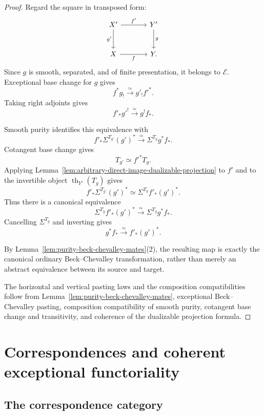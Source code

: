 \begin{proof}
Regard the square in transposed form:
\[
\begin{tikzcd}[column sep=large,row sep=large]
    X' \arrow[r,"f'"] \arrow[d,"g'"']
        & Y' \arrow[d,"g"] \\
    X \arrow[r,"f"']
        & Y.
\end{tikzcd}
\]
Since \(g\) is smooth, separated, and of finite presentation, it belongs
to \(\mathcal E\).  Exceptional base change for \(g\) gives
\[
    f^*g_!
    \xrightarrow{\simeq}
    g'_!f'^*.
\]
Taking right adjoints gives
\[
    f'_*g'^!
    \xrightarrow{\simeq}
    g^!f_*.
\]

Smooth purity identifies this equivalence with
\[
    f'_*
    \Sigma^{T_{g'}}(g')^*
    \xrightarrow{\simeq}
    \Sigma^{T_g}g^*f_*.
\]
Cotangent base change gives
\[
    T_{g'}
    \simeq
    f'^*T_g.
\]
Applying
Lemma~\ref{lem:arbitrary-direct-image-dualizable-projection}
to \(f'\) and to the invertible object
\(\operatorname{th}_{Y'}(T_g)\) gives
\[
    f'_*
    \Sigma^{T_{g'}}(g')^*
    \simeq
    \Sigma^{T_g}f'_*(g')^*.
\]
Thus there is a canonical equivalence
\[
    \Sigma^{T_g}f'_*(g')^*
    \xrightarrow{\simeq}
    \Sigma^{T_g}g^*f_*.
\]
Cancelling \(\Sigma^{T_g}\) and inverting gives
\[
    g^*f_*
    \xrightarrow{\simeq}
    f'_*(g')^*.
\]

By
Lemma~\ref{lem:purity-beck-chevalley-mates}(2),
the resulting map is exactly the canonical ordinary Beck--Chevalley
transformation, rather than merely an abstract equivalence between its
source and target.

The horizontal and vertical pasting laws and the composition
compatibilities follow from
Lemma~\ref{lem:purity-beck-chevalley-mates},
exceptional Beck--Chevalley pasting, composition compatibility of smooth
purity, cotangent base change and transitivity, and coherence of the
dualizable projection formula.
\end{proof}


\section{Correspondences and coherent exceptional functoriality}
\label{sec:exceptional-correspondences}

\subsection{The correspondence category}


